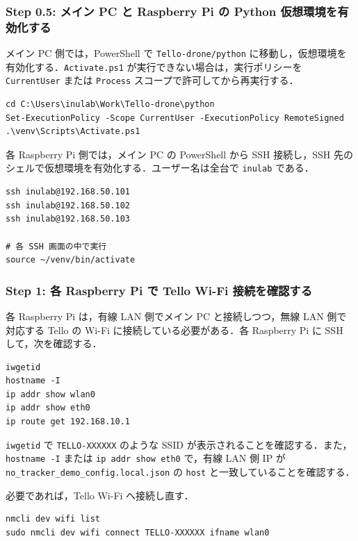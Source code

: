 \subsubsection{Step 0.5: メイン PC と Raspberry Pi の Python 仮想環境を有効化する}

メイン PC 側では，PowerShell で \texttt{Tello-drone/python} に移動し，仮想環境を有効化する．\texttt{Activate.ps1} が実行できない場合は，実行ポリシーを \texttt{CurrentUser} または \texttt{Process} スコープで許可してから再実行する．

\begin{lstlisting}
cd C:\Users\inulab\Work\Tello-drone\python
Set-ExecutionPolicy -Scope CurrentUser -ExecutionPolicy RemoteSigned
.\venv\Scripts\Activate.ps1
\end{lstlisting}

各 Raspberry Pi 側では，メイン PC の PowerShell から SSH 接続し，SSH 先のシェルで仮想環境を有効化する．ユーザー名は全台で \texttt{inulab} である．

\begin{lstlisting}
ssh inulab@192.168.50.101
ssh inulab@192.168.50.102
ssh inulab@192.168.50.103

# 各 SSH 画面の中で実行
source ~/venv/bin/activate
\end{lstlisting}

\subsubsection{Step 1: 各 Raspberry Pi で Tello Wi-Fi 接続を確認する}

各 Raspberry Pi は，有線 LAN 側でメイン PC と接続しつつ，無線 LAN 側で対応する Tello の Wi-Fi に接続している必要がある．各 Raspberry Pi に SSH して，次を確認する．

\begin{lstlisting}
iwgetid
hostname -I
ip addr show wlan0
ip addr show eth0
ip route get 192.168.10.1
\end{lstlisting}

\texttt{iwgetid} で \texttt{TELLO-XXXXXX} のような SSID が表示されることを確認する．また，\texttt{hostname -I} または \texttt{ip addr show eth0} で，有線 LAN 側 IP が \texttt{no\_tracker\_demo\_config.local.json} の \texttt{host} と一致していることを確認する．

必要であれば，Tello Wi-Fi へ接続し直す．

\begin{lstlisting}
nmcli dev wifi list
sudo nmcli dev wifi connect TELLO-XXXXXX ifname wlan0
\end{lstlisting}

